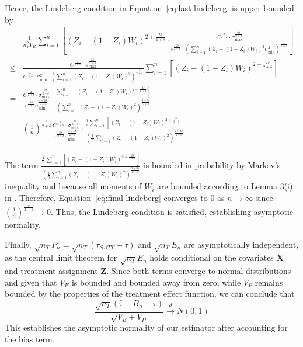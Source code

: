 \documentclass{mytemplate}
\begin{document}
Hence, the Lindeberg condition in Equation~\ref{eq:last-lindeberg} is upper bounded by
\begin{align}
   & \frac{1}{n_T^2 V_E} \sum_{i=1}^n \left[ (Z_i - (1-Z_i) W_i)^{2 + \frac{2\delta}{2+\delta}} \cdot \frac{C^{\frac{2}{2+\delta}} \cdot \sigma_{\max}^{\frac{2\delta}{2+\delta}}}{\epsilon^{\frac{2\delta}{2+\delta}} \cdot \left( \sum_{i=1}^n (Z_i - (1-Z_i) W_i)^2 \sigma_{\min}^2 \right)^{\frac{\delta}{2+\delta}}}\right] \\
\leq& \frac{C^{\frac{2}{2+\delta}} \cdot \sigma_{\max}^{\frac{2\delta}{2+\delta}}}{\epsilon^{\frac{2\delta}{2+\delta}} \cdot \sigma_{\min}^2 \cdot \left( \sum_{i=1}^n (Z_i - (1-Z_i) W_i)^2 \right)^{\frac{\delta}{2+\delta}}} \sum_{i=1}^n \left[ (Z_i - (1-Z_i) W_i)^{2 + \frac{2\delta}{2+\delta}}\right] \\
=& \frac{C^{\frac{2}{2+\delta}} \cdot \sigma_{\max}^{\frac{2\delta}{2+\delta}}}{\epsilon^{\frac{2\delta}{2+\delta}} \sigma_{\min}^{\frac{4 + 6\delta}{2+\delta}}} \cdot \frac{\sum_{i=1}^n \left[ (Z_i - (1-Z_i) W_i)^{2 + \frac{2\delta}{2+\delta}}\right]}{\left( \sum_{i=1}^n (Z_i - (1-Z_i) W_i)^2 \right)^{\frac{2 + 3\delta}{2+\delta}}} \\
=& \left(\frac{1}{n}\right)^{\frac{\delta}{2 + \delta}} \frac{C^{\frac{2}{2+\delta}} \cdot \sigma_{\max}^{\frac{2\delta}{2+\delta}}}{\epsilon^{\frac{2\delta}{2+\delta}} \sigma_{\min}^{\frac{4 + 6\delta}{2+\delta}}} \cdot \frac{\frac{1}{n} \sum_{i=1}^n \left[ (Z_i - (1-Z_i) W_i)^{2 + \frac{2\delta}{2+\delta}}\right]}{\left(\frac{1}{n} \sum_{i=1}^n (Z_i - (1-Z_i) W_i)^2 \right)^{\frac{2 + 3\delta}{2+\delta}}} \label{eq:final-lindeberg}
\end{align}

The term $\frac{\frac{1}{n} \sum_{i=1}^n \left[ (Z_i - (1-Z_i) W_i)^{2 + \frac{2\delta}{2+\delta}}\right]}{\left(\frac{1}{n} \sum_{i=1}^n (Z_i - (1-Z_i) W_i)^2 \right)^{\frac{2 + 3\delta}{2+\delta}}}$ is bounded in probability by Markov's inequality and because all moments of $W_i$ are bounded according to Lemma 3(i) in \cite{abadie2006large}. Therefore, Equation~\ref{eq:final-lindeberg} converges to 0 as $n \to \infty$ since $\left(\frac{1}{n}\right)^{\frac{\delta}{2 + \delta}} \to 0$. Thus, the Lindeberg condition is satisfied, establishing asymptotic normality.

Finally, $\sqrt{n_T} P_n =  \sqrt{n_T}(\tau_{SATT}-\tau) $ and $\sqrt{n_T}E_n$ are asymptotically independent, as the central limit theorem for $\sqrt{n_T}E_n$ holds conditional on the covariates $\mathbf{X}$ and treatment assignment $\mathbf{Z}$. Since both terms converge to normal distributions and given that $V_E$ is bounded and bounded away from zero, while $V_P$ remains bounded by the properties of the treatment effect function, we can conclude that 
\begin{equation}
\frac{\sqrt{n_T}(\hat{\tau} - B_n - \tau)}{\sqrt{V_E + V_P}} \xrightarrow{d} N(0,1)
\end{equation}
This establishes the asymptotic normality of our estimator after accounting for the bias term.
\end{document}
